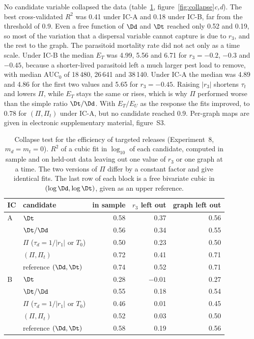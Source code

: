 No candidate variable collapsed the data (table~\ref{tab:collapse}, figure~\ref{fig:collapse}\emph{c,d}). The best cross-validated $R^2$ was 0.41 under IC-A and 0.18 under IC-B, far from the threshold of 0.9. Even a free function of $\Dd$ and $\Dt$ reached only 0.52 and 0.19, so most of the variation that a dispersal variable cannot capture is due to $r_3$, and the rest to the graph. The parasitoid mortality rate did not act only as a time scale. Under IC-B the median $E_T$ was 4.99, 5.56 and 6.71 for $r_3 = -0.2$, $-0.3$ and $-0.45$, because a shorter-lived parasitoid left a much larger pest load to remove, with median $\mathrm{AUC}_0$ of 18\,480, 26\,641 and 38\,140. Under IC-A the median was 4.89 and 4.86 for the first two values and 5.65 for $r_3 = -0.45$. Raising $|r_3|$ shortens $\tau_t$ and lowers $\Pi$, while $E_T$ stays the same or rises, which is why $\Pi$ performed worse than the simple ratio $\Dt/\Dd$. With $E_T/E_U$ as the response the fits improved, to 0.78 for $(\Pi,\Pi_t)$ under IC-A, but no candidate reached 0.9. Per-graph maps are given in electronic supplementary material, figure~S3.

\begin{table}[t]
\centering
\caption{Collapse test for the efficiency of targeted releases (Experiment~8, $m_d = m_t = 0$). $R^2$ of a cubic fit in $\log_{10}$ of each candidate, computed in sample and on held-out data leaving out one value of $r_3$ or one graph at a time. The two versions of $\Pi$ differ by a constant factor and give identical fits. The last row of each block is a free bivariate cubic in $(\log\Dd,\log\Dt)$, given as an upper reference.}
\label{tab:collapse}
\small
\begin{tabular}{llrrr}
\toprule
IC & candidate & in sample & $r_3$ left out & graph left out\\
\midrule
A & $\Dt$                      & 0.58 & 0.37 & 0.56\\
  & $\Dt/\Dd$                  & 0.56 & 0.34 & 0.55\\
  & $\Pi$ ($\tau_d = 1/|r_1|$ or $T_0$) & 0.50 & 0.23 & 0.50\\
  & $(\Pi, \Pi_t)$             & 0.72 & 0.41 & 0.71\\
  & reference $(\Dd, \Dt)$     & 0.74 & 0.52 & 0.71\\
\midrule
B & $\Dt$                      & 0.28 & $-0.01$ & 0.27\\
  & $\Dt/\Dd$                  & 0.55 & 0.18 & 0.54\\
  & $\Pi$ ($\tau_d = 1/|r_1|$ or $T_0$) & 0.46 & 0.01 & 0.45\\
  & $(\Pi, \Pi_t)$             & 0.52 & 0.03 & 0.50\\
  & reference $(\Dd, \Dt)$     & 0.58 & 0.19 & 0.56\\
\bottomrule
\end{tabular}
\end{table}

